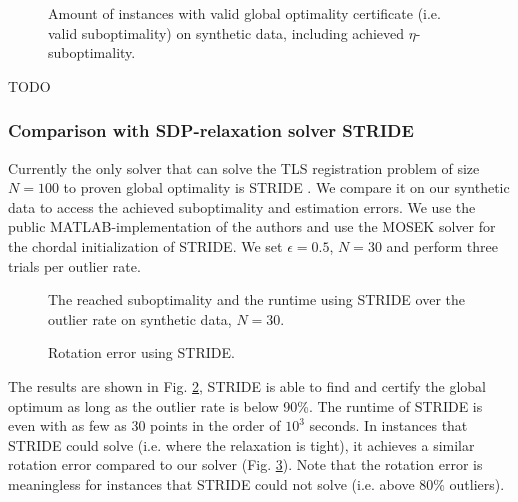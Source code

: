 \begin{figure}[!ht]
	\centering
	\caption{Amount of instances with valid global optimality certificate (i.e. valid suboptimality) on synthetic data, including achieved $\eta$-suboptimality.}
	\label{fig:cert-validity}
\end{figure}

TODO 

\subsubsection{Comparison with SDP-relaxation solver STRIDE} Currently the only solver that can solve the TLS registration problem of size $N=100$ to proven global optimality is STRIDE \cite{9785843}. We compare it on our synthetic data to access the achieved suboptimality and estimation errors. We use the public MATLAB-implementation of the authors and use the MOSEK solver for the chordal initialization of STRIDE.
We set $\epsilon = 0.5$, $N=30$ and perform three trials per outlier rate.

\begin{figure}[!ht]
	\centering
	\caption{The reached suboptimality and the runtime using STRIDE over the outlier rate on synthetic data, $N=30$.}
	\label{fig:stride-subopt-eval}
\end{figure}
\begin{figure}[!ht]
	\centering
	\caption{Rotation error using STRIDE.}
	\label{fig:stride-rot-err}
\end{figure}

The results are shown in Fig. \ref{fig:stride-subopt-eval}, STRIDE is able to find and certify the global optimum as long as the outlier rate is below 90\%. The runtime of STRIDE is even with as few as 30 points in the order of $10^3$ seconds. In instances that STRIDE could solve (i.e. where the relaxation is tight), it achieves a similar rotation error compared to our solver (Fig. \ref{fig:stride-rot-err}). Note that the rotation error is meaningless for instances that STRIDE could not solve (i.e. above 80\% outliers).

